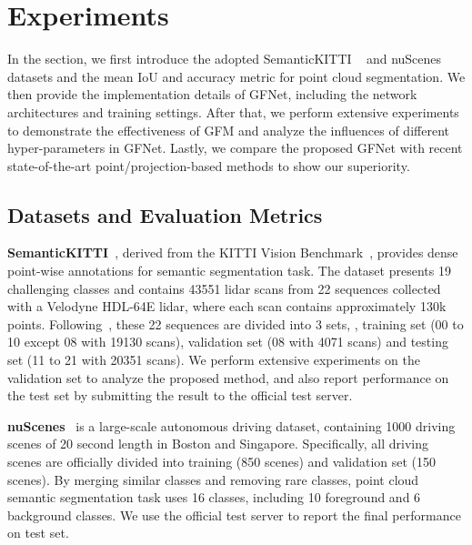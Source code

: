 \section{Experiments}
\label{sec:experiments}
In the section, we first introduce the adopted SemanticKITTI ~\citep{behley2019semantickitti} and nuScenes~\citep{caesar2020nuscenes} datasets and the mean IoU and accuracy metric for point cloud segmentation. We then provide the implementation details of GFNet, including the network architectures and training settings. After that, we perform extensive experiments to demonstrate the effectiveness of GFM and analyze the influences of different hyper-parameters in GFNet. Lastly, we compare the proposed GFNet with recent state-of-the-art point/projection-based methods to show our superiority.






\subsection{Datasets and Evaluation Metrics}
\label{sec:dataset}
\textbf{SemanticKITTI}~\citep{behley2019semantickitti}, derived from the KITTI Vision Benchmark~\citep{geiger2012we}, provides dense point-wise annotations for semantic segmentation task. The dataset presents 19 challenging classes and contains 43551 lidar scans from 22 sequences collected with a Velodyne HDL-64E lidar, where each scan contains approximately 130k points. Following~\cite{behley2019semantickitti,milioto2019rangenet++}, these 22 sequences are divided into 3 sets, \ie, training set (00 to 10 except 08 with 19130 scans), validation set (08 with 4071 scans) and testing set (11 to 21 with 20351 scans). We perform extensive experiments on the validation set to analyze the proposed method, and also report performance on the test set by submitting the result to the official test server. 

\textbf{nuScenes}~\citep{caesar2020nuscenes} is a  large-scale autonomous driving dataset, containing 1000 driving scenes of 20 second length in Boston and Singapore. Specifically, all driving scenes are officially divided into training (850 scenes) and validation set (150 scenes). By merging similar classes and removing rare classes, point cloud semantic segmentation task uses 16 classes, including 10 foreground and 6 background classes. We use the official test server to report the final performance on test set.

